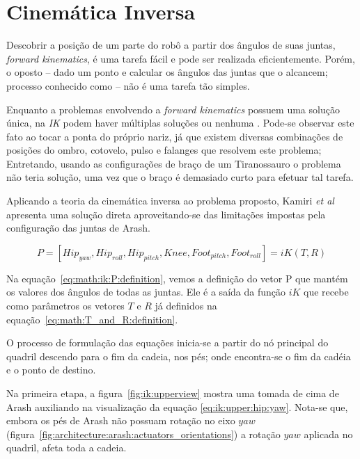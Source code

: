 \section{Cinemática Inversa}

Descobrir a posição de um parte do robô a partir dos ângulos de suas juntas, \textit{forward kinematics}, é uma tarefa fácil e pode ser realizada eficientemente. Porém, o oposto -- dado um ponto e calcular os ângulos das juntas que o alcancem; processo conhecido como -- não é uma tarefa tão simples.

Enquanto a problemas envolvendo a \textit{forward kinematics} possuem uma solução única, na \textit{IK} podem haver múltiplas soluções ou nenhuma \cite{spong2005robot}. Pode-se observar este fato ao tocar a ponta do próprio nariz, já que existem diversas combinações de posições do ombro, cotovelo, pulso e falanges que resolvem este problema; Entretando, usando as configurações de braço de um Tiranossauro o problema não teria solução, uma vez que o braço é demasiado curto para efetuar tal tarefa.

Aplicando a teoria da cinemática inversa ao problema proposto, Kamiri \textit{et al} apresenta uma solução direta aproveitando-se das limitações impostas pela configuração das juntas de Arash.

\begin{equation}
	\label{eq:math:ik:P:definition}
	P = [Hip_{yaw}, Hip_{roll}, Hip_{pitch}, Knee, Foot_{pitch}, Foot_{roll}] = iK(T, R)
\end{equation}

Na equação~\ref{eq:math:ik:P:definition}, vemos a definição do vetor P que mantém os valores dos ângulos de todas as juntas. Ele é a saída da função $iK$ que recebe como parâmetros os vetores $T$ e $R$ já definidos na equação~\ref{eq:math:T_and_R:definition}.

O processo de formulação das equações inicia-se a partir do nó principal do quadril descendo para o fim da cadeia, nos pés; onde encontra-se o fim da cadéia e o ponto de destino.

Na primeira etapa, a figura~\ref{fig:ik:upperview} mostra uma tomada de cima de Arash auxiliando na visualização da equação \ref{eq:ik:upper:hip:yaw}. Nota-se que, embora os pés de Arash não possuam rotação no eixo $yaw$ (figura~\ref{fig:architecture:arash:actuators_orientations}) a rotação $yaw$ aplicada no quadril, afeta toda a cadeia.

